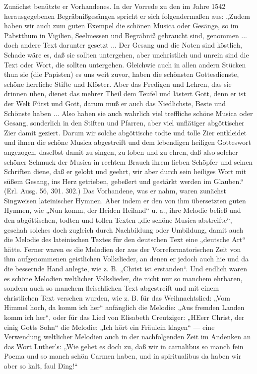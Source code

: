 Zunächst benützte er Vorhandenes. In der Vorrede zu den im Jahre 1542 herausgegebenen Begräbnißgesängen spricht er sich folgendermaßen aus: „Zudem haben wir auch zum guten Exempel die schönen Musica oder Gesänge, so im Pabstthum in Vigilien, Seelmessen und Begräbniß gebraucht sind, genommen ... doch andere Text darunter gesetzt ... Der Gesang und die Noten sind köstlich, Schade wäre es, daß sie sollten untergehen, aber unchristlich und unrein sind die Text oder Wort, die sollten untergehen. Gleichwie auch in allen andern Stücken thun sie (die Papisten) es uns weit zuvor, haben die schönsten Gottesdienste, schöne herrliche Stifte und Klöster. Aber das Predigen und Lehren, das sie drinnen üben, dienet das mehrer Theil dem Teufel und lästert Gott, denn er ist der Welt Fürst und Gott, darum muß er auch das Niedlichste, Beste und Schönste haben ... Also haben sie auch wahrlich viel treffliche schöne Musica oder Gesang, sonderlich in den Stiften und Pfarren, aber viel unflätiger abgöttischer Zier damit geziert. Darum wir solche abgöttische todte und tolle Zier entkleidet und ihnen die schöne Musica abgestreift und dem lebendigen heiligen Gotteswort angezogen, daselbst damit zu singen, zu loben und zu ehren, daß also solcher schöner Schmuck der Musica in rechtem Brauch ihrem lieben Schöpfer und seinen Schriften diene, daß er gelobt und geehrt, wir aber durch sein heiliges Wort mit süßem Gesang, ins Herz getrieben, gebeßert und gestärkt werden im Glauben.“ (Erl. Ausg. 56, 301. 302.) Das Vorhandene, was er nahm, waren zunächst Singweisen lateinischer Hymnen. Aber indem er den von ihm übersetzten guten Hymnen, wie „Nun komm, der Heiden Heiland“ u. a., ihre Melodie beließ und den abgöttischen, todten und tollen Texten „die schöne Musica abstreifte“, geschah solches doch zugleich durch Nachbildung oder Umbildung, damit auch die Melodie des lateinischen Textes für den deutschen Text eine „deutsche Art“ hätte. Ferner waren es die Melodien der aus der Vorreformatorischen
Zeit von ihm aufgenommenen geistlichen Volkslieder, an denen er jedoch auch hie und da die bessernde Hand anlegte, wie z. B. „Christ ist erstanden“. Und endlich waren es schöne Melodien weltlicher Volkslieder, die nicht nur so manchem ehrbaren, sondern auch so manchem fleischlichen Text abgestreift und mit einem christlichen Text versehen wurden, wie z. B. für das Weihnachtslied: „Vom Himmel hoch, da komm ich her“ anfänglich die Melodie: „Aus fremden Landen komm ich her“, oder für das Lied von Elisabeth Creutziger: „HEerr Christ, der einig Gotts Sohn“ die Melodie: „Ich hört ein Fräulein klagen“ — eine Verwendung weltlicher Melodien auch in der nachfolgenden Zeit im Andenken an das Wort Luther’s: „Wie gehet es doch zu, daß wir in carnalibus so manch fein Poema und so manch schön Carmen haben, und in spiritualibus da haben wir aber so kalt, faul Ding!“

